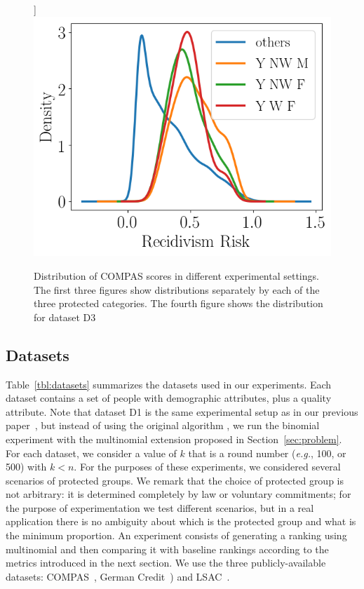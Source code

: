 \begin{figure}[t]
	\label{fig:dataset:compas:worstThree}]
	{\includegraphics[width=.48\textwidth]{pics/compas_worstThreeGroups_kde.png}}\hfill
	\vspace{-3mm}
	\caption{Distribution of COMPAS scores in different experimental settings. The first three figures show distributions separately by each of the three protected categories. The fourth figure shows the distribution for dataset D3}
	\label{fig:dataset:compas}
	\vspace{-3mm}
\end{figure}

\subsection{Datasets}\label{sec:experiments-datasets}

Table~\ref{tbl:datasets} summarizes the datasets used in our experiments.
%
Each dataset contains a set of people with demographic attributes, plus a quality attribute.
%
Note that dataset D1 is the same experimental setup as in our previous paper~\cite{zehlike2017fair}, but instead of using the original algorithm \algoFAIR, we run the binomial experiment with the multinomial extension proposed in Section~\ref{sec:problem}.
%
For each dataset, we consider a value of $k$ that is a round number ({\em e.g.}, 100, or 500) with $k<n$.
%
For the purposes of these experiments, we considered several scenarios of protected groups.
%
We remark that the choice of protected group is not arbitrary: it is determined completely by law or voluntary commitments; for the purpose of experimentation we test different scenarios, but in a real application there is no ambiguity about which is the protected group and what is the minimum proportion.
%
An experiment consists of generating a ranking using multinomial \algoFAIR and then comparing it with baseline rankings according to the metrics introduced in the next section.
%
We use the three publicly-available datasets: COMPAS~\cite{angwin_2016_machine}, German Credit~\cite{lichman_2013_uci}) and LSAC~\cite{wightman1998lsac}.

